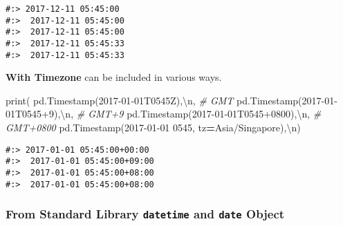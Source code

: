 \documentclass[
]{book}
\newenvironment{Shaded}{\begin{snugshade}}{\end{snugshade}}
\newcommand{\BuiltInTok}[1]{#1}
\newcommand{\CharTok}[1]{\textcolor[rgb]{0.5,0.5,0.5}{#1}}
\newcommand{\CommentTok}[1]{\textcolor[rgb]{0.37,0.37,0.37}{\textit{#1}}}
\newcommand{\NormalTok}[1]{#1}
\newcommand{\OperatorTok}[1]{\textcolor[rgb]{0.43,0.43,0.43}{\textbf{#1}}}
\newcommand{\StringTok}[1]{\textcolor[rgb]{0.5,0.5,0.5}{#1}}
\begin{document}
\begin{verbatim}
#:> 2017-12-11 05:45:00 
#:>  2017-12-11 05:45:00 
#:>  2017-12-11 05:45:00 
#:>  2017-12-11 05:45:33 
#:>  2017-12-11 05:45:33
\end{verbatim}

\textbf{With Timezone} can be included in various ways.

\begin{Shaded}
\begin{Highlighting}[]
\BuiltInTok{print}\NormalTok{( pd.Timestamp(}\StringTok{\textquotesingle{}2017{-}01{-}01T0545Z\textquotesingle{}}\NormalTok{),}\StringTok{\textquotesingle{}}\CharTok{\textbackslash{}n}\StringTok{\textquotesingle{}}\NormalTok{,  }\CommentTok{\# GMT }
\NormalTok{       pd.Timestamp(}\StringTok{\textquotesingle{}2017{-}01{-}01T0545+9\textquotesingle{}}\NormalTok{),}\StringTok{\textquotesingle{}}\CharTok{\textbackslash{}n}\StringTok{\textquotesingle{}}\NormalTok{, }\CommentTok{\# GMT+9}
\NormalTok{       pd.Timestamp(}\StringTok{\textquotesingle{}2017{-}01{-}01T0545+0800\textquotesingle{}}\NormalTok{),}\StringTok{\textquotesingle{}}\CharTok{\textbackslash{}n}\StringTok{\textquotesingle{}}\NormalTok{,   }\CommentTok{\# GMT+0800}
\NormalTok{       pd.Timestamp(}\StringTok{\textquotesingle{}2017{-}01{-}01 0545\textquotesingle{}}\NormalTok{, tz}\OperatorTok{=}\StringTok{\textquotesingle{}Asia/Singapore\textquotesingle{}}\NormalTok{),}\StringTok{\textquotesingle{}}\CharTok{\textbackslash{}n}\StringTok{\textquotesingle{}}\NormalTok{)}
\end{Highlighting}
\end{Shaded}

\begin{verbatim}
#:> 2017-01-01 05:45:00+00:00 
#:>  2017-01-01 05:45:00+09:00 
#:>  2017-01-01 05:45:00+08:00 
#:>  2017-01-01 05:45:00+08:00
\end{verbatim}

\hypertarget{from-standard-library-datetime-and-date-object}{%
\subsubsection{\texorpdfstring{From Standard Library \texttt{datetime} and \texttt{date} Object}{From Standard Library datetime and date Object}}\label{from-standard-library-datetime-and-date-object}}
\end{document}
